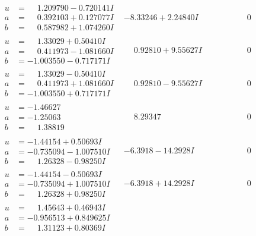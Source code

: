 \documentclass[1p]{elsarticle_modified}
\theoremstyle{definition}
\begin{document}
$$\begin{array}{c|c|c}
\begin{aligned}
u &= \phantom{-}1.209790 - 0.720141 I \\
a &= \phantom{-}0.392103 + 0.127077 I \\
b &= \phantom{-}0.587982 + 1.074260 I\end{aligned}
 & -8.33246 + 2.24840 I & \phantom{-0.000000 } 0 \\ \hline\begin{aligned}
u &= \phantom{-}1.33029 + 0.50410 I \\
a &= \phantom{-}0.411973 - 1.081660 I \\
b &= -1.003550 - 0.717171 I\end{aligned}
 & \phantom{-}0.92810 + 9.55627 I & \phantom{-0.000000 } 0 \\ \hline\begin{aligned}
u &= \phantom{-}1.33029 - 0.50410 I \\
a &= \phantom{-}0.411973 + 1.081660 I \\
b &= -1.003550 + 0.717171 I\end{aligned}
 & \phantom{-}0.92810 - 9.55627 I & \phantom{-0.000000 } 0 \\ \hline\begin{aligned}
u &= -1.46627\phantom{ +0.000000I} \\
a &= -1.25063\phantom{ +0.000000I} \\
b &= \phantom{-}1.38819\phantom{ +0.000000I}\end{aligned}
 & \phantom{-}8.29347\phantom{ +0.000000I} & \phantom{-0.000000 } 0 \\ \hline\begin{aligned}
u &= -1.44154 + 0.50693 I \\
a &= -0.735094 - 1.007510 I \\
b &= \phantom{-}1.26328 - 0.98250 I\end{aligned}
 & -6.3918 - 14.2928 I & \phantom{-0.000000 } 0 \\ \hline\begin{aligned}
u &= -1.44154 - 0.50693 I \\
a &= -0.735094 + 1.007510 I \\
b &= \phantom{-}1.26328 + 0.98250 I\end{aligned}
 & -6.3918 + 14.2928 I & \phantom{-0.000000 } 0 \\ \hline\begin{aligned}
u &= \phantom{-}1.45643 + 0.46943 I \\
a &= -0.956513 + 0.849625 I \\
b &= \phantom{-}1.31123 + 0.80369 I\end{aligned}

\end{array}$$
\end{document}
